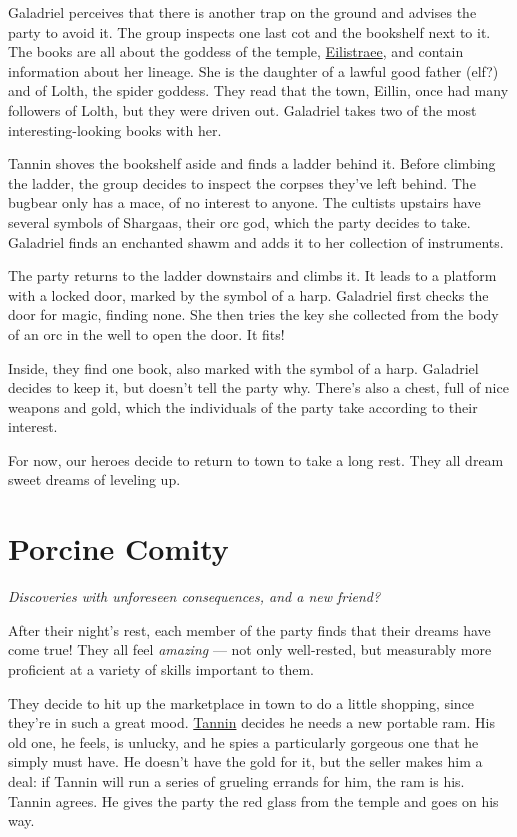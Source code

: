 \documentclass[smalldemyvopaper,11pt,twoside,onecolumn,openright,extrafontsizes]{memoir}
\newcommand{\chapdesc}[1]{
    \begin{flushright}
    \emph{{#1}}
    \end{flushright}
    \vspace{26pt}
}
\begin{document}
Galadriel perceives that there is another trap on the ground and advises
the party to avoid it. The group inspects one last cot and the bookshelf
next to it. The books are all about the goddess of the temple,
\href{/characters/eilistraee/}{Eilistraee}, and contain information
about her lineage. She is the daughter of a lawful good father (elf?)
and of Lolth, the spider goddess. They read that the town, Eillin, once
had many followers of Lolth, but they were driven out. Galadriel takes
two of the most interesting-looking books with her.

Tannin shoves the bookshelf aside and finds a ladder behind it. Before
climbing the ladder, the group decides to inspect the corpses they've
left behind. The bugbear only has a mace, of no interest to anyone. The
cultists upstairs have several symbols of Shargaas, their orc god, which
the party decides to take. Galadriel finds an enchanted shawm and adds
it to her collection of instruments.

The party returns to the ladder downstairs and climbs it. It leads to a
platform with a locked door, marked by the symbol of a harp. Galadriel
first checks the door for magic, finding none. She then tries the key
she collected from the body of an orc in the well to open the door. It
fits!

Inside, they find one book, also marked with the symbol of a harp.
Galadriel decides to keep it, but doesn't tell the party why. There's
also a chest, full of nice weapons and gold, which the individuals of
the party take according to their interest.

For now, our heroes decide to return to town to take a long rest. They
all dream sweet dreams of leveling up.


\chapter{Porcine Comity}
\chapdesc{Discoveries with unforeseen consequences, and a new friend?}

After their night's rest, each member of the party finds that their
dreams have come true! They all feel \emph{amazing} --- not only
well-rested, but measurably more proficient at a variety of skills
important to them.

They decide to hit up the marketplace in town to do a little shopping,
since they're in such a great mood. \href{/characters/tannin/}{Tannin}
decides he needs a new portable ram. His old one, he feels, is unlucky,
and he spies a particularly gorgeous one that he simply must have. He
doesn't have the gold for it, but the seller makes him a deal: if Tannin
will run a series of grueling errands for him, the ram is his. Tannin
agrees. He gives the party the red glass from the temple and goes on his
way.
\end{document}
